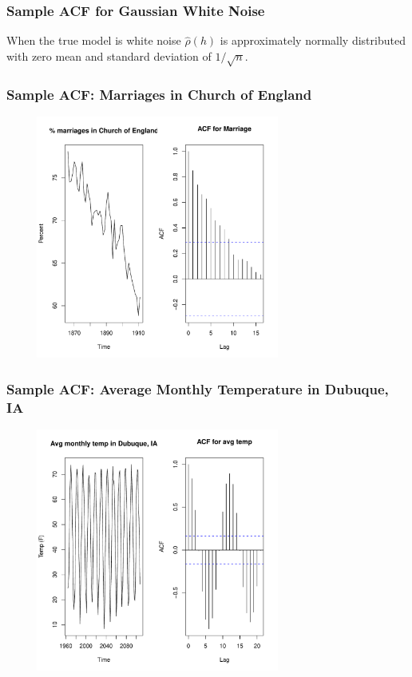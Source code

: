 \documentclass[%
xcolor=pdftex]{beamer}
\begin{document}
\begin{frame}
\frametitle{Sample ACF for Gaussian White Noise}

When the true model is white noise $\hat{\rho}(h)$ is approximately normally distributed with zero mean and standard deviation of $1/\sqrt{n}$.

\end{frame}


\begin{frame}
\frametitle{Sample ACF: Marriages in Church of England}

\includegraphics[width=100mm, height=80mm]{pics/acf_marriage.pdf}

\end{frame}

\begin{frame}
\frametitle{Sample ACF: Average Monthly Temperature in Dubuque, IA}

\includegraphics[width=100mm, height=80mm]{pics/acf_dubuque.pdf}

\end{frame}
\end{document}
